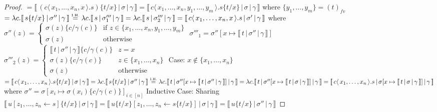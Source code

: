 \documentclass[a4paper,UKenglish,cleveref, autoref]{lipics-v2019}
\newcommand{\fv}[1]{(#1)_{fv}}
\newcommand{\set}[1]{ \{ #1 \} }
\newcommand{\abs}[2]{\lambda #1 . #2}
\newcommand{\fake}[3]{#1 \langle \, #2 \, \rangle . #3}
\newcommand{\share}[3]{#1 [#2 \leftarrow #3]}
\newcommand{\sub}[3]{#1 \{ #2 / #3 \}}
\newcommand{\readbackwmap}[3]{\llbracket \, #1 \, \vert \, #2 \, \vert \, #3  \, \rrbracket }
\newcommand{\IH}{\stackrel{\hbox{\tiny I.H.}}{\hbox{=}}}
\begin{document}
\begin{proof}
\newline
\indent $= \readbackwmap{(\fake{c}{x_{1}, \dots, x_{n}, x}{s}) \sub{}{t}{x}}{\sigma}{\gamma} = \readbackwmap{\fake{c}{x_{1}, \dots, x_{n}, y_{1}, \dots, y_{m}}{s} \sub{}{t}{x}}{\sigma}{\gamma}$
\newline
\indent where $\set{y_{1}, \dots, y_{m}} = \fv{t}$
\newline
\indent $= \abs{c}{\readbackwmap{s \sub{}{t}{x}}{\sigma''}{\gamma}} \IH \abs{c}{\readbackwmap{s}{\sigma'''_{1}}{\gamma}} = \abs{c}{\readbackwmap{s}{\sigma'''_{2}}{\gamma}} = \readbackwmap{\fake{c}{x_{1}, \dots, x_{n}, x}{s}}{\sigma'}{\gamma}$
\newline
\indent where $\sigma''(z) = \begin{cases} \sigma(z) \sub{}{c}{\gamma(c)} & \text{if } z \in \set{x_{1}, \dots, x_{n}, y_{1}, \dots, y_{m}} \\ \sigma(z) & \text{otherwise} \end{cases}$
\newline
\indent $\sigma'''_{1} = \sigma''[x \mapsto \readbackwmap{t}{\sigma''}{\gamma}]$
\newline
\indent $\sigma'''_{2}(z) = \begin{cases} \readbackwmap{t}{\sigma''}{\gamma} \sub{}{c}{\gamma(c)} & z = x \\ \sigma(z) \sub{}{c}{\gamma(c)} & z \in \set{x_{1}, \dots, x_{n}} \\ \sigma(z) & \text{otherwise} \end{cases}$
\newline
\newline
\indent Case: $x \not\in \set{x_{1}, \dots, x_{n}}$
\newline
\indent $= \readbackwmap{\fake{c}{x_{1}, \dots, x_{n}}{s \sub{}{t}{x}}}{\sigma}{\gamma} = \abs{c}{\readbackwmap{s \sub{}{t}{x}}{\sigma''}{\gamma}} \IH \abs{c}{\readbackwmap{t}{\sigma''[x \mapsto \readbackwmap{t}{\sigma''}{\gamma}]}{\gamma}} = \abs{c}{\readbackwmap{t}{\sigma''[x \mapsto \readbackwmap{t}{\sigma}{\gamma}]}{\gamma}} = \readbackwmap{\fake{c}{x_{1}, \dots, x_{n}}{s}}{\sigma[x \mapsto \readbackwmap{t}{\sigma}{\gamma}]}{\gamma}$
\newline
\indent where
\newline
\indent $\sigma'' = \sigma[x_{i} \mapsto \sigma(x_{i}) \sub{}{c}{\gamma(c)}]_{i \in [n]}$
\newline
\newline
Inductive Case: Sharing
\newline
$\readbackwmap{\share{u}{z_{1}, \dots, z_{n}}{s} \sub{}{t}{x}}{\sigma}{\gamma} = \readbackwmap{\share{u \sub{}{t}{x}}{z_{1}, \dots, z_{n}}{s \sub{}{t}{x}} }{\sigma}{\gamma} = \readbackwmap{u \sub{}{t}{x}}{\sigma''}{\gamma}$

\end{proof}
\end{document}

